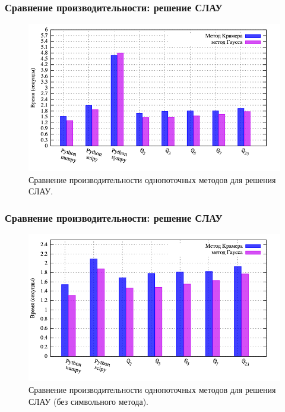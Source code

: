 \documentclass[10pt,professionalfont,utf8,presentation,compress]{beamer}
\theoremstyle{definition}
\theoremstyle{plain}
\begin{document}
\begin{frame}
\frametitle{Сравнение производительности: решение СЛАУ}
\begin{figure}[H]
\centerline{\includegraphics[width=0.95\linewidth]{../gnuplot/single/system/plot.png}}
\caption{Сравнение производительности однопоточных методов для решения СЛАУ.}
\label{img:single:system:1}
\end{figure}
\end{frame}


\begin{frame}
\frametitle{Сравнение производительности: решение СЛАУ}
\begin{figure}[H]
\centerline{\includegraphics[width=0.95\linewidth]{../gnuplot/single/system/wosymb.png}}
\caption{Сравнение производительности однопоточных методов для решения СЛАУ (без символьного метода).}
\label{img:single:system:2}
\end{figure}
\end{frame}
\end{document}
